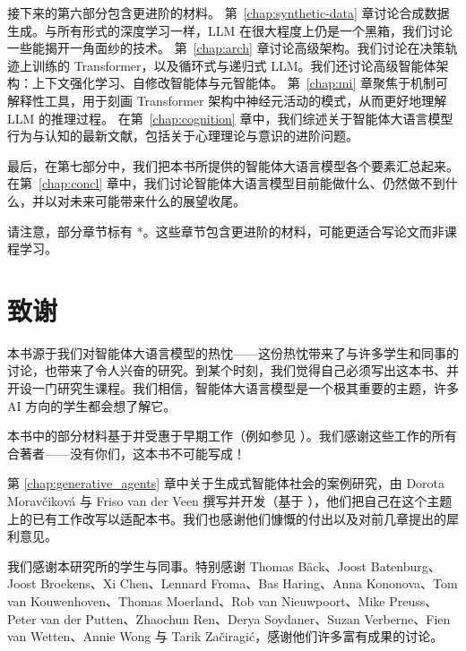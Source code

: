 接下来的第六部分包含更进阶的材料。
第~\ref{chap:synthetic-data} 章讨论合成数据生成。与所有形式的深度学习一样，LLM 在很大程度上仍是一个黑箱，我们讨论一些能揭开一角面纱的技术。
第~\ref{chap:arch} 章讨论高级架构。我们讨论在决策轨迹上训练的 Transformer，以及循环式与递归式 LLM。我们还讨论高级智能体架构：上下文强化学习、自修改智能体与元智能体。
第~\ref{chap:mi} 章聚焦于机制可解释性工具，用于刻画 Transformer 架构中神经元活动的模式，从而更好地理解 LLM 的推理过程。%
在第~\ref{chap:cognition} 章中，我们综述关于智能体大语言模型行为与认知的最新文献，包括关于心理理论与意识的进阶问题。

最后，在第七部分中，我们把本书所提供的智能体大语言模型各个要素汇总起来。在第~\ref{chap:concl} 章中，我们讨论智能体大语言模型目前能做什么、仍然做不到什么，并以对未来可能带来什么的展望收尾。

请注意，部分章节标有 *。这些章节包含更进阶的材料，可能更适合写论文而非课程学习。

\section{致谢}
本书源于我们对智能体大语言模型的热忱——这份热忱带来了与许多学生和同事的讨论，也带来了令人兴奋的研究。到某个时刻，我们觉得自己必须写出这本书、并开设一门研究生课程。我们相信，智能体大语言模型是一个极其重要的主题，许多 AI 方向的学生都会想了解它。

本书中的部分材料基于并受惠于早期工作（例如参见 \citet{van2023theory,van2024hybrid,huisman2021survey,moerland2023model,plaat2022deep,plaat2024reasoning, plaat2025agentic,van2024llamea,chen2025does,van2025baba,xing2025cocomposer}）。我们感谢这些工作的所有合著者——没有你们，这本书不可能写成！

第 \ref{chap:generative_agents} 章中关于生成式智能体社会的案例研究，由 Dorota Moravčiková 与 Friso van der Veen 撰写并开发（基于 \citep{park2023generative}），他们把自己在这个主题上的已有工作改写以适配本书。我们也感谢他们慷慨的付出以及对前几章提出的犀利意见。

我们感谢本研究所的学生与同事。特别感谢 Thomas B\"ack、Joost Batenburg、Joost Broekens、Xi Chen、Lennard Froma、Bas Haring、Anna Kononova、Tom van Kouwenhoven、Thomas Moerland、Rob van Nieuwpoort、Mike Preuss、Peter van der Putten、Zhaochun Ren、Derya Soydaner、Suzan Verberne、Fien van Wetten、Annie Wong 与 Tarik Začiragić，感谢他们许多富有成果的讨论。



